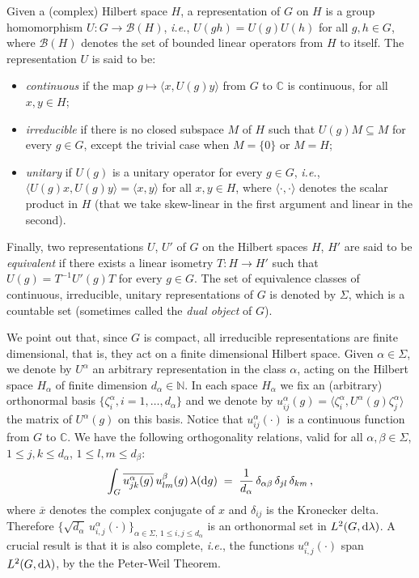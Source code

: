 \documentclass[a4paper,reqno,11pt]{amsart}
\numberwithin{equation}{section}
\newcommand{\cB}{{\ensuremath{\mathcal B}} }
\newcommand{\ga}{\alpha}
\newcommand{\gb}{\beta}
\newcommand{\dd}{\text{\rm d}}             %
\newcommand{\C}{\mathbb{C}}
\newcommand{\N}{\mathbb{N}}
\begin{document}
Given a (complex) Hilbert space $H$, a representation of $G$ on $H$ is a 
group homomorphism $U:G \to \cB(H)$, {\sl i.e.}, $U(gh) = U(g)U(h)$ for all $g,h \in G$,
where $\cB(H)$ denotes the set of bounded linear operators
from $H$ to itself. The representation $U$ is said to be:
\begin{itemize}
\item {\sl continuous} if the map $g \mapsto \langle x, U(g) y \rangle$
from $G$ to $\C$ is continuous, for all $x,y \in H$;
\item {\sl irreducible} if there is no closed subspace $M$ of $H$ such that 
$U(g) M \subseteq M$ for every $g \in G$, 
except the trivial case when $M=\{0\}$ or $M=H$;
\item {\sl unitary} if $U(g)$ is a unitary operator for every $g \in G$, {\sl i.e.},
$\langle U(g) x, U(g) y \rangle = \langle x,y \rangle$ for all $x,y \in H$, where
$\langle\cdot,\cdot\rangle$ denotes the scalar product in $H$ (that we
take skew-linear in the first argument and linear in the second).
\end{itemize}
Finally, two representations $U$, $U'$ of $G$ on the Hilbert spaces $H$, $H'$
are said to be {\sl equivalent} if there exists a linear isometry $T: H \to H'$
such that $U(g) = T^{-1} U'(g) T$ for every $g \in G$.
The set of equivalence classes of continuous, irreducible, unitary representations
of $G$ is denoted by $\Sigma$, which is a countable
set (sometimes called the {\sl dual object} of $G$).


We point out that, since $G$ is compact, all irreducible representations are
finite dimensional, that is, they act on a finite dimensional Hilbert space.
Given $\alpha \in \Sigma$, we denote by $U^\alpha$
an arbitrary representation in the class $\alpha$, acting on the Hilbert space $H_\alpha$
of finite dimension $d_\alpha \in \N$. 
In each space $H_\alpha$ we fix an (arbitrary) orthonormal basis
$\{\zeta^\alpha_i, i=1,\dots,d_\alpha\}$ and we denote by
$u^{\alpha}_{ij}(g) = \langle \zeta^\alpha_i, U^\alpha(g) \zeta_j^\alpha \rangle$
the matrix of $U^\alpha(g)$ on this basis.
Notice that $u^{\alpha}_{ij}(\cdot)$ is a continuous function from $G$ to $\C$.
We have the following orthogonality relations, valid for all
$\ga,\beta \in \Sigma$, $1 \le j,k \le d_{\alpha}$, $1 \le l,m \le d_{\beta}$:
\begin{equation}
  \label{eq:ortho-coeffs}
\int_G \overline{u^\alpha_{jk}(g)} \, u^\beta_{lm}(g) \, \lambda(\dd g) \;=\;
\frac {1}{d_\alpha} \, \delta_{\ga \gb} \, \delta_{jl} \, \delta_{km} \,,
\end{equation}
where $\overline{x}$ denotes the complex conjugate of $x$ and $\delta_{ij}$
is the Kronecker delta.
Therefore $\{\sqrt{d_\alpha} \, u^\alpha_{i,j}(\cdot)\}_{\alpha \in \Sigma,\,
1 \le i,j \le d_\alpha}$ is an orthonormal set in $L^2(G, \dd\lambda)$.
A crucial result is that it is also complete, {\sl i.e.},
the functions $u^\ga_{i,j}(\cdot)$ span $L^2(G, \dd\lambda)$,
by the the Peter-Weil Theorem.
\end{document}
